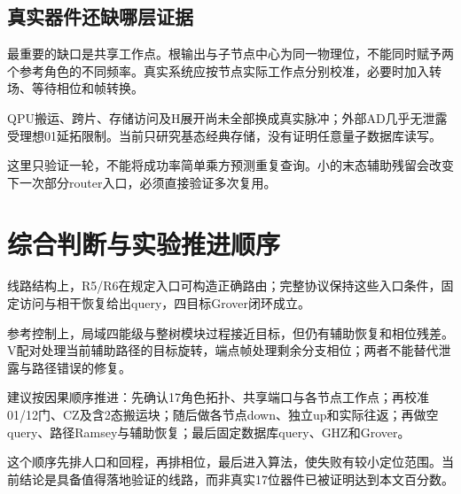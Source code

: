 \subsection{真实器件还缺哪层证据}
最重要的缺口是共享工作点。根输出与子节点中心为同一物理位，不能同时赋予两个参考角色的不同频率。真实系统应按节点实际工作点分别校准，必要时加入转场、等待相位和帧转换。

QPU搬运、跨片、存储访问及H展开尚未全部换成真实脉冲；外部AD几乎无泄露受理想01延拓限制。当前只研究基态经典存储，没有证明任意量子数据库读写。

这里只验证一轮，不能将成功率简单乘方预测重复查询。小的末态辅助残留会改变下一次部分router入口，必须直接验证多次复用。
\FloatBarrier

\section{综合判断与实验推进顺序}\label{sec:conclusion}
线路结构上，R5/R6在规定入口可构造正确路由；完整协议保持这些入口条件，固定访问与相干恢复给出query，四目标Grover闭环成立。

参考控制上，局域四能级与整树模块过程接近目标，但仍有辅助恢复和相位残差。V配对处理当前辅助路径的目标旋转，端点帧处理剩余分支相位；两者不能替代泄露与路径错误的修复。

建议按因果顺序推进：先确认17角色拓扑、共享端口与各节点工作点；再校准01/12门、CZ及含2态搬运块；随后做各节点down、独立up和实际往返；再做空query、路径Ramsey与辅助恢复；最后固定数据库query、GHZ和Grover。

这个顺序先排人口和回程，再排相位，最后进入算法，使失败有较小定位范围。当前结论是具备值得落地验证的线路，而非真实17位器件已被证明达到本文百分数。
